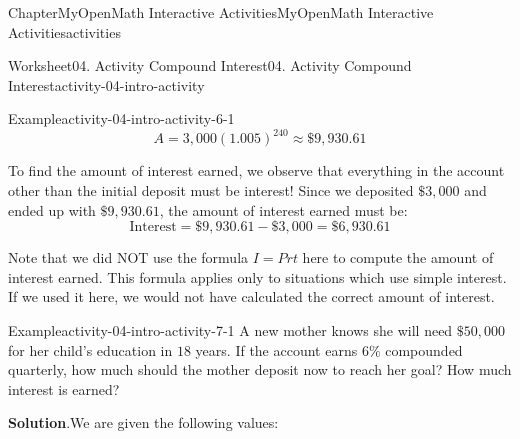 \documentclass[oneside,10pt,]{book}
\newcommand{\blocktitlefont}{\relax}
\newcommand{\ptxlistdisc}{\raisebox{0.3ex}{\textbullet}}
\newlength{\fillinmaxwidth}
\newlength{\fillincontract}
\newlength{\charmaxwidth}\setlength{\charmaxwidth}{0.5em}
\newlength{\charminwidth}\setlength{\charminwidth}{0.1em}
\newlength{\fillinheight}
\newcommand{\fillintext}[1]{%
\setlength{\fillinmaxwidth}{#1\charmaxwidth}%
\setlength{\fillincontract}{#1\charminwidth}%
\setlength{\fillinheight}{\baselineskip}\addtolength{\fillinheight}{1.2pt}%
\strut\nobreak\leaders\vbox{\hrule width 0.3pt height 0.3pt \vskip -1.2pt}\hskip 1\fillinmaxwidth minus \fillincontract\nobreak\strut%
}
\begin{document}
\begin{chapterptx}{Chapter}{MyOpenMath Interactive Activities}{}{MyOpenMath Interactive Activities}{}{}{activities}
\begin{worksheet-section}{Worksheet}{04. Activity Compound Interest}{}{04. Activity Compound Interest}{}{}{activity-04-intro-activity}
\begin{example}{Example}{}{activity-04-intro-activity-6-1}
\begin{equation*}
\end{equation*}
%
\begin{equation*}
A = 3,000(1.005)^{240} \approx \$9,930.61
\end{equation*}
%
\par
To find the amount of interest earned, we observe that everything in the account other than the initial deposit must be interest! Since we deposited \(\$3,000\) and ended up with \(\$9,930.61\), the amount of interest earned must be:%
\begin{equation*}
\text{Interest} = \$9,930.61 - \$3,000 = \$6,930.61
\end{equation*}
%
\par
Note that we did NOT use the formula \(I = Prt\) here to compute the amount of interest earned. This formula applies only to situations which use simple interest. If we used it here, we would not have calculated the correct amount of interest.%
\end{example}
%
\clearpage
\begin{example}{Example}{}{activity-04-intro-activity-7-1}%
A new mother knows she will need \(\$50,000\) for her child’s education in \(18\) years. If the account earns \(6\%\) compounded quarterly, how much should the mother deposit now to reach her goal? How much interest is earned?%
\par\smallskip%
\noindent\textbf{\blocktitlefont Solution}.\hypertarget{activity-04-intro-activity-7-1-2}{}\quad{}We are given the following values:%

\end{example}
\end{worksheet-section}
\end{chapterptx}
\end{document}
